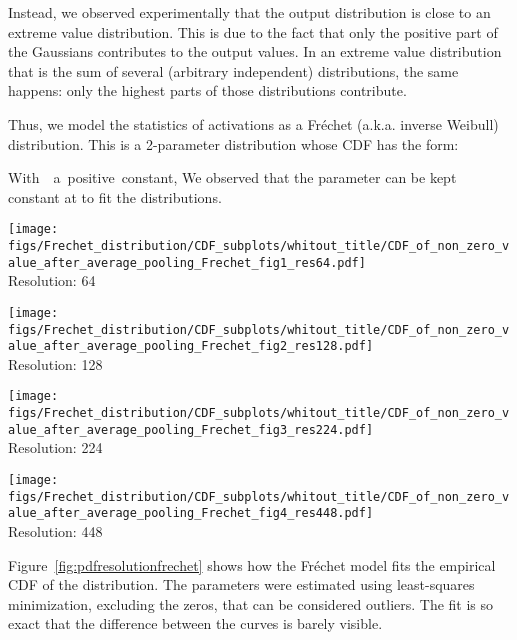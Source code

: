 \documentclass{article}
\begin{document}
Instead, we observed experimentally that the output distribution is close to an extreme value distribution. 
This is due to the fact that only the positive part of the Gaussians contributes to the output values.
In an extreme value distribution that is the sum of several (arbitrary independent) distributions, the same happens: only the highest parts of those distributions contribute. 

Thus, we model the statistics of activations as a Fr\'echet (a.k.a. inverse Weibull) distribution. 
This is a 2-parameter distribution whose CDF has the form: 

With~~a~positive~constant,  
We observed that the parameter  can be kept constant at  to fit the distributions.



\begin{figure*}[b]
\begin{minipage}{0.24\linewidth}
    \texttt{[image: figs/Frechet\_distribution/CDF\_subplots/whitout\_title/CDF\_of\_non\_zero\_value\_after\_average\_pooling\_Frechet\_fig1\_res64.pdf]}  \\
    Resolution: 64
\end{minipage}
\hfill
\begin{minipage}{0.24\linewidth}
\texttt{[image: figs/Frechet\_distribution/CDF\_subplots/whitout\_title/CDF\_of\_non\_zero\_value\_after\_average\_pooling\_Frechet\_fig2\_res128.pdf]} \\
Resolution: 128
\end{minipage}
\hfill
\begin{minipage}{0.24\linewidth}
\texttt{[image: figs/Frechet\_distribution/CDF\_subplots/whitout\_title/CDF\_of\_non\_zero\_value\_after\_average\_pooling\_Frechet\_fig3\_res224.pdf]} \\
Resolution: 224
\end{minipage}
\hfill
\begin{minipage}{0.24\linewidth}
\texttt{[image: figs/Frechet\_distribution/CDF\_subplots/whitout\_title/CDF\_of\_non\_zero\_value\_after\_average\_pooling\_Frechet\_fig4\_res448.pdf]} \\
 Resolution: 448
 \end{minipage}   
\caption{\label{fig:pdfresolutionfrechet}
    Fitting of the CDF of activations with a Fr\'echet distribution.
}
\end{figure*}

Figure~\ref{fig:pdfresolutionfrechet} shows how the Fr\'echet model fits the empirical CDF of the distribution. 
The parameters were estimated using least-squares minimization, excluding the zeros, that can be considered outliers.
The fit is so exact that the difference between the curves is barely visible.
\end{document}
